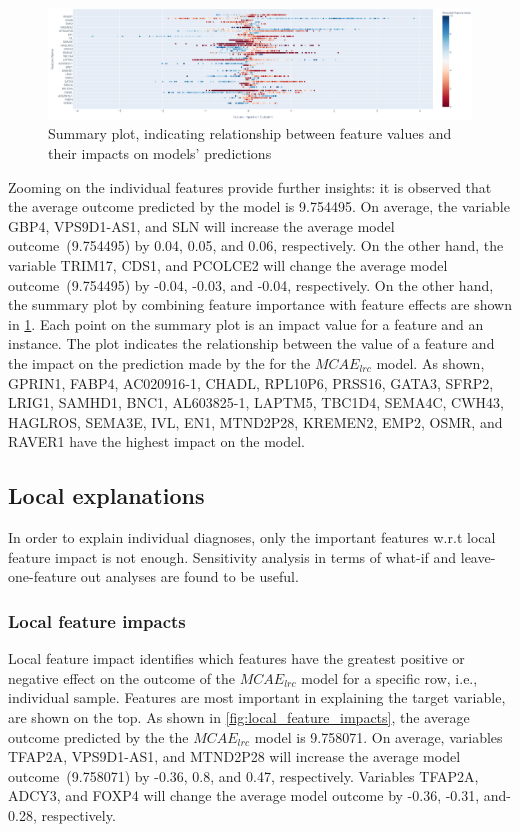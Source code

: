 \begin{figure}
    \centering
	\includegraphics[scale=0.6]{images/summary_plot.png}
	\caption{Summary plot, indicating relationship between feature values and their impacts on models' predictions}
    \label{fig:local_feature_impacts5}
\end{figure}

\hspace*{3.5mm} Zooming on the individual features provide further insights: it is observed that the average outcome predicted by the model is 9.754495. On average, the variable GBP4, VPS9D1-AS1, and SLN will increase the average model outcome~(9.754495) by 0.04, 0.05, and 0.06, respectively. On the other hand, the variable TRIM17, CDS1, and PCOLCE2 will change the average model outcome~(9.754495) by -0.04, -0.03, and -0.04, respectively. On the other hand, the summary plot by combining feature importance with feature effects are shown in \cref{fig:local_feature_impacts5}. Each point on the summary plot is an impact value for a feature and an instance. The plot indicates the relationship between the value of a feature and the impact on the prediction made by the for the $MCAE_{lrc}$ model. As shown, GPRIN1, FABP4, AC020916-1, CHADL, RPL10P6, PRSS16, GATA3, SFRP2, LRIG1, SAMHD1, BNC1, AL603825-1, LAPTM5, TBC1D4, SEMA4C, CWH43, HAGLROS, SEMA3E, IVL, EN1, MTND2P28, KREMEN2, EMP2, OSMR, and RAVER1 have the highest impact on the model. 

\subsection{Local explanations}
In order to explain individual diagnoses, only the important features w.r.t local feature impact is not enough. Sensitivity analysis in terms of what-if and leave-one-feature out analyses are found to be useful. 

\subsubsection{Local feature impacts}
Local feature impact identifies which features have the greatest positive or negative effect on the outcome of the $MCAE_{lrc}$ model for a specific row, i.e., individual sample. Features are most important in explaining the target variable, are shown on the top. As shown in \cref{fig:local_feature_impacts}, the average outcome predicted by the the $MCAE_{lrc}$ model is 9.758071. On average, variables TFAP2A, VPS9D1-AS1, and MTND2P28 will increase the average model outcome~(9.758071) by -0.36, 0.8, and 0.47, respectively. Variables TFAP2A, ADCY3, and FOXP4 will change the average model outcome by -0.36, -0.31, and-0.28, respectively. 

